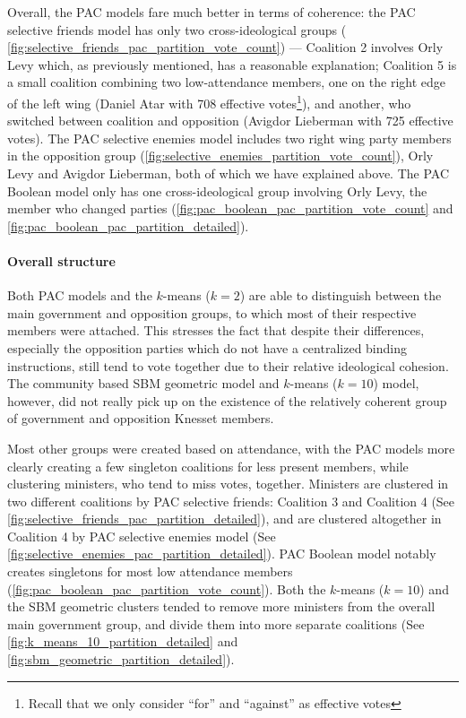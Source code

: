 Overall, the PAC models fare much better in terms of coherence:
the PAC selective friends model has only two cross-ideological groups (
\autoref{fig:selective_friends_pac_partition_vote_count}) ---
Coalition 2 involves Orly Levy which, as previously mentioned, has a reasonable
explanation; Coalition 5 is a small coalition combining two low-attendance
members, one on the right edge of the left wing (Daniel Atar with 708 effective
votes\footnote{Recall that we only consider ``for'' and ``against'' as
effective votes}), and another, who switched between coalition and opposition
(Avigdor Lieberman with 725 effective votes).
The PAC selective enemies model includes two right wing party members in the
opposition group (\autoref{fig:selective_enemies_partition_vote_count}),
Orly Levy and Avigdor Lieberman, both of which we have explained above.
The PAC Boolean model only has one cross-ideological group involving Orly Levy,
the member who changed parties (\autoref{fig:pac_boolean_pac_partition_vote_count}
and \autoref{fig:pac_boolean_pac_partition_detailed}).

\paragraph{Overall structure}
Both PAC models and the $k$-means ($k=2$) are able to distinguish between the
main government and opposition groups, to which most
of their respective members were attached.
This stresses the fact that despite their differences, especially the opposition
parties which do not have a centralized binding instructions, still tend to
vote together due to their relative ideological cohesion.
The community based SBM geometric model and $k$-means ($k=10$) model, however,
did not really pick up on the existence of the relatively coherent group of
government and opposition Knesset members.

Most other groups were created based on attendance, with the PAC models more
clearly creating a few singleton coalitions for less present members, while
clustering ministers, who tend to miss votes, together.
Ministers are clustered in two different coalitions by PAC selective friends:
Coalition 3 and Coalition 4
(See \autoref{fig:selective_friends_pac_partition_detailed}), and are clustered
altogether in Coalition 4 by PAC selective enemies model (See
\autoref{fig:selective_enemies_pac_partition_detailed}).
PAC Boolean model notably creates singletons for most low attendance members
(\autoref{fig:pac_boolean_pac_partition_vote_count}).
Both the $k$-means ($k=10$) and the SBM geometric clusters tended to remove
more ministers from the overall main government group, and divide them into
more separate coalitions (See \autoref{fig:k_means_10_partition_detailed} and 
\autoref{fig:sbm_geometric_partition_detailed}).

